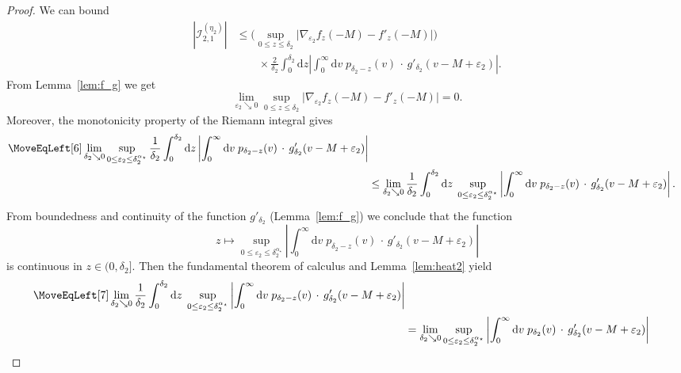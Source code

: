 \documentclass[oneside,final,11pt]{amsart}
\theoremstyle{definition}
\renewcommand{\d}{\mathrm{d}}
\newcommand{\1}[1]{\mathbf{1}_{#1}}
\newcommand{\eps}{\varepsilon}
\newcommand{\CI}{\mathcal{I}}
\numberwithin{equation}{section}
\begin{document}
\begin{proof}
\smallskip
\noindent{\bf The term $\CI^{(\eta_2)}_{2,1}$.} We can bound
\begin{equation}
\begin{split}
|\CI^{(\eta_2)}_{2, 1}|
 &\leq \Big(\sup_{0 \leq z \leq \delta_2} \bigl|\nabla_{\!\eps_2} f_z(-M) - f'_z(-M)\bigr|\Big)\\
 &\qquad\times \frac{2}{\delta_2} \int_{0}^{\delta_2}\!\!\! \d z \left|\int_{0}^{\infty} \d v\;  p_{\delta_2 - z}(v) \,\cdot\, g'_{\delta_2}(v - M + \eps_2)\right|.
 \end{split}\label{eq:I21}
\end{equation}
From Lemma~\ref{lem:f_g} we get
\begin{equation}\label{eq:f_vanishes}
	\lim_{\eps_2 \searrow 0} \sup_{0 \leq z \leq \delta_2} \bigl|\nabla_{\!\eps_2} f_z(-M) - f'_z(-M)\bigr| = 0.
\end{equation}
Moreover, the monotonicity property of the Riemann integral gives
\begin{align}
\MoveEqLeft[6]
	\lim_{\delta_2 \searrow 0} \sup_{0 \leq \eps_2 \leq \delta_2^{\alpha_\star}} \frac{1}{\delta_2} \int_{0}^{\delta_2} \d z \left|\int_{0}^{\infty} \d v\;  p_{\delta_2 - z}(v) \,\cdot\, g'_{\delta_2}(v - M + \eps_2)\right| \\
	& \leq \lim_{\delta_2 \searrow 0} \frac{1}{\delta_2} \int_{0}^{\delta_2} \d z\; \sup_{0 \leq \eps_2 \leq \delta_2^{\alpha_\star}} \left|\int_{0}^{\infty} \d v\;  p_{\delta_2 - z}(v) \,\cdot\, g'_{\delta_2}(v - M + \eps_2)\right|.
\end{align}
From boundedness and continuity of the function $g'_{\delta_2}$ (Lemma~\ref{lem:f_g}) we conclude that the function
\begin{equation}
	z  \mapsto  \sup_{0 \leq \eps_2 \leq \delta_2^{\alpha_\star}} \left|\int_{0}^{\infty} \d v\;  p_{\delta_2 - z}(v) \,\cdot\, g'_{\delta_2}(v - M + \eps_2)\right|
\end{equation}
is continuous in $z \in (0, \delta_2]$. Then the fundamental theorem of calculus and Lemma~\ref{lem:heat2} yield
\begin{equation}
	\begin{split}
	\MoveEqLeft[7]
	\lim_{\delta_2 \searrow 0} \frac{1}{\delta_2} \int_{0}^{\delta_2} \d z\; \sup_{0 \leq \eps_2 \leq \delta_2^{\alpha_\star}} \left|\int_{0}^{\infty} \d v\;  p_{\delta_2 - z}(v) \,\cdot\, g'_{\delta_2}(v - M + \eps_2)\right| \\
		&=\lim_{\delta_2 \searrow 0} \sup_{0 \leq \eps_2 \leq \delta_2^{\alpha_\star}} \left|\int_{0}^{\infty} \d v\;  p_{\delta_2}(v) \,\cdot\, g'_{\delta_2}(v - M + \eps_2)\right| \\

\end{split}
\end{equation}
\end{proof}
\end{document}
